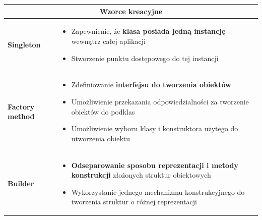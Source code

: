 \documentclass[a4paper]{article}
\begin{document}
    \begin{table}[H]
        \begin{center}
            \begin{tabular}{  p{3cm} p{12cm}  }
                \toprule

                \multicolumn{2}{c}{Wzorce kreacyjne}\\

                \toprule

                \textbf{Singleton}
                &
                \begin{itemize}
                    \item Zapewnienie, że \textbf{klasa posiada jedną instancję} wewnątrz całej aplikacji
                    \item Stworzenie punktu dostępowego do tej instancji
                \end{itemize}
                \\

                \cmidrule(r){1-1}\cmidrule(l){2-2}
                \textbf{Factory method}
                &
                \begin{itemize}
                    \item Zdefiniowanie \textbf{interfejsu do tworzenia obiektów}
                    \item Umożliwienie przekazania odpowiedzialności za tworzenie obiektów do podklas
                    \item Umożliwienie wyboru klasy i konstruktora użytego do utworzenia obiektu
                \end{itemize}
                \\

                \cmidrule(r){1-1}\cmidrule(l){2-2}
                \textbf{Builder}
                &
                \begin{itemize}
                    \item \textbf{Odseparowanie sposobu reprezentacji i metody konstrukcji} złożonych struktur obiektowych
                    \item Wykorzystanie jednego mechanizmu konstrukcyjnego do tworzenia struktur o różnej reprezentacji
                \end{itemize}\\

                \bottomrule

            \end{tabular}
        \end{center}
    \end{table}
\end{document}
